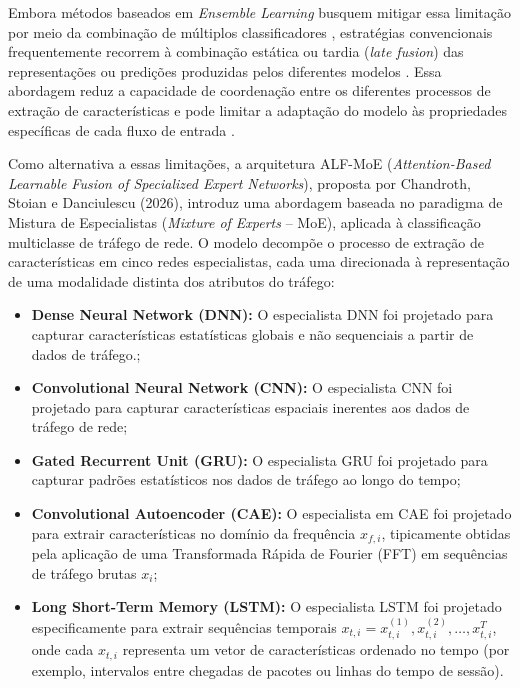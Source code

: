 \par{
	Embora métodos baseados em \emph{Ensemble Learning} busquem mitigar essa limitação por
	meio da combinação de múltiplos classificadores \cite{hsae2025}, estratégias convencionais frequentemente
	recorrem à combinação estática ou tardia (\emph{late fusion}) das representações ou
	predições produzidas pelos diferentes modelos \cite{alfmoe2026}. Essa abordagem reduz a capacidade de coordenação
	entre os diferentes processos de extração de características e pode limitar a adaptação do
	modelo às propriedades específicas de cada fluxo de entrada \cite{trafficmoe2026}.
}

\par{
	Como alternativa a essas limitações, a arquitetura ALF-MoE (\emph{Attention-Based Learnable Fusion of Specialized Expert Networks}), 
    proposta por Chandroth, Stoian e Danciulescu (2026), introduz uma abordagem baseada no paradigma de Mistura de Especialistas 
    (\emph{Mixture of Experts} -- MoE), aplicada à classificação multiclasse de tráfego de rede. O modelo decompõe o processo de extração 
    de características em cinco redes especialistas, cada uma direcionada à representação de uma modalidade distinta dos atributos do tráfego:
	\begin{itemize}
		\item \textbf{Dense Neural Network (DNN):} O especialista DNN foi projetado para capturar características estatísticas globais e não sequenciais a partir de dados de tráfego.; 
		\item \textbf{Convolutional Neural Network (CNN):} O especialista CNN foi projetado para capturar características espaciais inerentes aos dados de tráfego de rede;
		\item \textbf{Gated Recurrent Unit (GRU):} O especialista GRU foi projetado para capturar padrões estatísticos nos dados de tráfego ao longo do tempo;
		\item \textbf{Convolutional Autoencoder (CAE):} O especialista em CAE foi projetado para extrair características no domínio da frequência $x_{f,i}$, tipicamente obtidas pela aplicação de uma Transformada Rápida de Fourier (FFT) em sequências de tráfego brutas $x_i$;
		\item \textbf{Long Short-Term Memory (LSTM):} O especialista LSTM foi projetado especificamente para extrair sequências temporais $x_{t,i} = { x_{t,i}^{(1)} , x_ {t,i}^{(2)} , \dots , x_{t,i}^{T} }$, onde cada $x_{t,i}$ representa um vetor de características ordenado no tempo (por exemplo, intervalos entre chegadas de pacotes ou linhas do tempo de sessão).
	\end{itemize}
}

